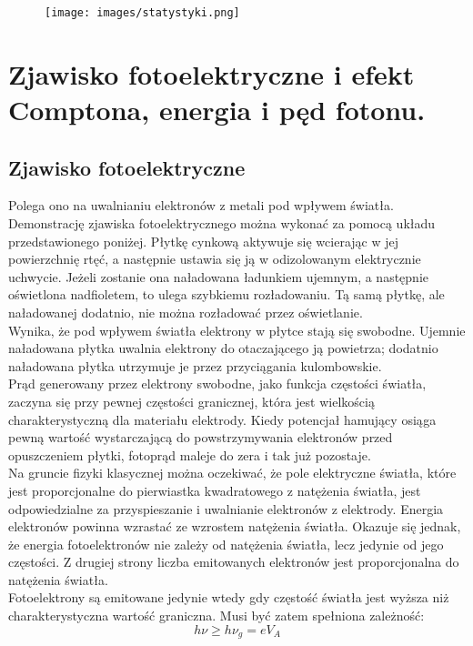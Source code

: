 \documentclass{article}
\begin{document}
\begin{figure}[H]
    \centering
\texttt{[image: images/statystyki.png]}
\end{figure}

\section{Zjawisko fotoelektryczne i efekt Comptona, energia i pęd fotonu.}

\subsection{Zjawisko fotoelektryczne}

Polega ono na uwalnianiu elektronów z metali pod wpływem światła. Demonstrację zjawiska fotoelektrycznego można wykonać za pomocą układu przedstawionego poniżej. Płytkę cynkową aktywuje się wcierając w jej powierzchnię rtęć, a następnie ustawia się ją w odizolowanym elektrycznie uchwycie. Jeżeli zostanie ona naładowana ładunkiem ujemnym, a następnie oświetlona nadfioletem, to ulega szybkiemu rozładowaniu. Tą samą płytkę, ale naładowanej dodatnio, nie można rozładować przez oświetlanie.  \\
Wynika, że pod wpływem światła elektrony w płytce stają się swobodne. Ujemnie naładowana płytka uwalnia elektrony do otaczającego ją powietrza; dodatnio naładowana płytka utrzymuje je przez przyciągania kulombowskie. \\
Prąd generowany przez elektrony swobodne, jako funkcja częstości światła, zaczyna się przy pewnej częstości granicznej, która jest wielkością charakterystyczną dla materiału elektrody. Kiedy potencjał hamujący osiąga pewną wartość wystarczającą do powstrzymywania elektronów przed opuszczeniem płytki, fotoprąd maleje do zera i tak już pozostaje. \\
Na gruncie fizyki klasycznej można oczekiwać, że pole elektryczne światła, które jest proporcjonalne do pierwiastka kwadratowego z natężenia światła, jest odpowiedzialne za przyspieszanie i uwalnianie elektronów z elektrody. Energia elektronów powinna wzrastać ze wzrostem natężenia światła. Okazuje się jednak, że energia fotoelektronów nie zależy od natężenia światła, lecz jedynie od jego częstości. Z drugiej strony liczba emitowanych elektronów jest proporcjonalna do natężenia światła. \\
Fotoelektrony są emitowane jedynie wtedy gdy częstość światła  jest wyższa niż charakterystyczna wartość graniczna. Musi być zatem spełniona zależność:
\begin{equation*}
    h\nu \geq h\nu_g=eV_A
\end{equation*}
\end{document}
